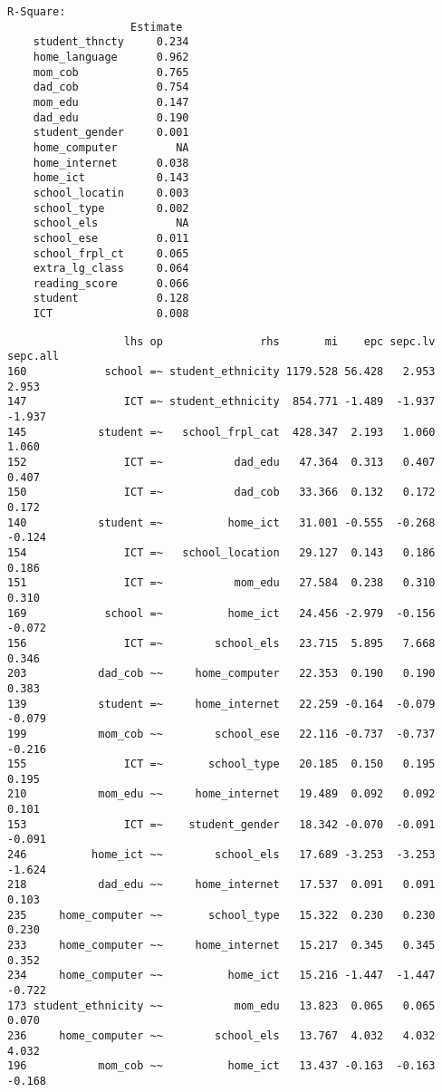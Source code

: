 \documentclass[
]{article}
\begin{document}
\begin{verbatim}
R-Square:
                   Estimate 
    student_thncty     0.234
    home_language      0.962
    mom_cob            0.765
    dad_cob            0.754
    mom_edu            0.147
    dad_edu            0.190
    student_gender     0.001
    home_computer         NA
    home_internet      0.038
    home_ict           0.143
    school_locatin     0.003
    school_type        0.002
    school_els            NA
    school_ese         0.011
    school_frpl_ct     0.065
    extra_lg_class     0.064
    reading_score      0.066
    student            0.128
    ICT                0.008
\end{verbatim}

\begin{verbatim}
                  lhs op               rhs       mi    epc sepc.lv sepc.all
160            school =~ student_ethnicity 1179.528 56.428   2.953    2.953
147               ICT =~ student_ethnicity  854.771 -1.489  -1.937   -1.937
145           student =~   school_frpl_cat  428.347  2.193   1.060    1.060
152               ICT =~           dad_edu   47.364  0.313   0.407    0.407
150               ICT =~           dad_cob   33.366  0.132   0.172    0.172
140           student =~          home_ict   31.001 -0.555  -0.268   -0.124
154               ICT =~   school_location   29.127  0.143   0.186    0.186
151               ICT =~           mom_edu   27.584  0.238   0.310    0.310
169            school =~          home_ict   24.456 -2.979  -0.156   -0.072
156               ICT =~        school_els   23.715  5.895   7.668    0.346
203           dad_cob ~~     home_computer   22.353  0.190   0.190    0.383
139           student =~     home_internet   22.259 -0.164  -0.079   -0.079
199           mom_cob ~~        school_ese   22.116 -0.737  -0.737   -0.216
155               ICT =~       school_type   20.185  0.150   0.195    0.195
210           mom_edu ~~     home_internet   19.489  0.092   0.092    0.101
153               ICT =~    student_gender   18.342 -0.070  -0.091   -0.091
246          home_ict ~~        school_els   17.689 -3.253  -3.253   -1.624
218           dad_edu ~~     home_internet   17.537  0.091   0.091    0.103
235     home_computer ~~       school_type   15.322  0.230   0.230    0.230
233     home_computer ~~     home_internet   15.217  0.345   0.345    0.352
234     home_computer ~~          home_ict   15.216 -1.447  -1.447   -0.722
173 student_ethnicity ~~           mom_edu   13.823  0.065   0.065    0.070
236     home_computer ~~        school_els   13.767  4.032   4.032    4.032
196           mom_cob ~~          home_ict   13.437 -0.163  -0.163   -0.168

\end{verbatim}
\end{document}

